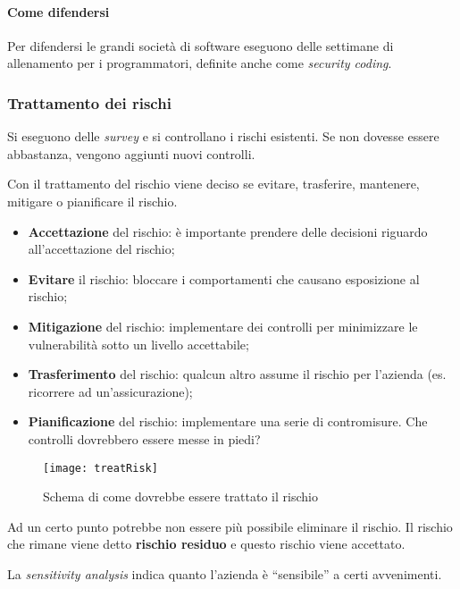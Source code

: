 \paragraph*{Come difendersi}

Per difendersi le grandi società di software eseguono delle settimane di
allenamento per i programmatori, definite anche come \textit{security coding}.



\subsubsection{Trattamento dei rischi}

Si eseguono delle \textit{survey} e si controllano i rischi esistenti. Se non
dovesse essere abbastanza, vengono aggiunti nuovi controlli.

Con il trattamento del rischio viene deciso se evitare, trasferire, mantenere,
mitigare o pianificare il rischio.

\begin{itemize}
\item \textbf{Accettazione} del rischio: è importante prendere delle decisioni
riguardo all'accettazione del rischio;
\item \textbf{Evitare} il rischio: bloccare i comportamenti che causano
esposizione al rischio;
\item \textbf{Mitigazione} del rischio: implementare dei controlli per
minimizzare le vulnerabilità sotto un livello accettabile;
\item \textbf{Trasferimento} del rischio: qualcun altro assume il rischio per
l'azienda (es. ricorrere ad un'assicurazione);
\item \textbf{Pianificazione} del rischio: implementare una serie di
contromisure. Che controlli dovrebbero essere messe in piedi?
\end{itemize}

\begin{figure}[H]
 \centering
 \texttt{[image: treatRisk]}
 \caption{Schema di come dovrebbe essere trattato il rischio}
\end{figure}



Ad un certo punto potrebbe non essere più possibile eliminare il rischio. Il
rischio che rimane viene detto \textbf{rischio residuo} e questo rischio viene
accettato.

La \textit{sensitivity analysis} indica quanto l'azienda è ``sensibile'' a
certi avvenimenti.

